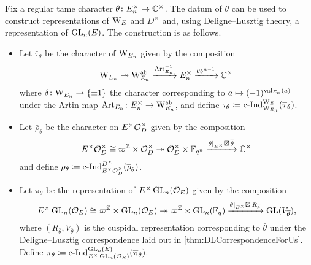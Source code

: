 \documentclass[../main.tex]{subfiles}
\begin{document}
Fix a regular tame character $\theta\colon  E_n^\times \to \mathbb{C}^\times$. 
The datum of $\theta$ can be used to construct representations
of $\mathrm W_E$ and $D^\times$ and, using Deligne--Lusztig
theory, a representation of $\operatorname{GL}_n(E)$. The construction is as follows.
\begin{itemize}
  \item Let $\bar \tau_\theta$ be the character of $\mathrm W_{E_n}$ given by 
    the composition
    \begin{equation*}
      \mathrm W_{E_n} \twoheadrightarrow \mathrm W_{E_n}^{\mathrm{ab}} \xrightarrow{\operatorname{Art}_{E_n}^{-1}} E_n^\times \xrightarrow{\theta \delta^{n-1}} \mathbb{C}^\times
    \end{equation*}
    where $\delta\colon \mathrm W_{E_n} \to \{\pm 1\}$ the character corresponding to
    $a \mapsto (-1)^{\mathrm{val}_{E_n}(a)}$ under the Artin map $\operatorname{Art}_{E_n}\colon
    E_n^\times \to \mathrm W_{E_n}^{\mathrm{ab}}$,
    and define $\tau_\theta \coloneqq \operatorname{c\text{-}Ind}_{\mathrm W_{E_n}}^{\mathrm W_E}(\overline \tau_\theta)$.

  \item Let $\bar \rho_\theta$ be the character on 
    $E^\times \mathcal{O}_D^\times$ given by the composition
    \begin{equation*}
      E^\times\mathcal{O}_D^\times \cong \varpi^{\mathbb{Z}} \times \mathcal{O}_D^\times \twoheadrightarrow 
      \mathcal{O}_D^\times \times \mathbb{F}_{q^n} \xrightarrow{\theta|_{E^\times} \boxtimes \,
      \overline \theta} \mathbb{C}^\times
    \end{equation*}
    and define $\rho_\theta \coloneqq \operatorname{c\text{-}Ind}_{E^\times
    \mathcal{O}_D^\times}^{D^\times}(\overline \rho_\theta)$.

  \item Let $\bar \pi_\theta$ be the representation of $E^\times \operatorname{GL}_n(\mathcal{O}_E)$
    given by the composition
    \begin{equation*}
      E^\times \operatorname{GL}_n(\mathcal{O}_E) \cong \varpi^{\mathbb{Z}} \times \operatorname{GL}_n(\mathcal{O}_E)
      \twoheadrightarrow \varpi^{\mathbb{Z}} \times \operatorname{GL}_n(\mathbb{F}_q) \xrightarrow{\theta|_{E^\times} \boxtimes \, 
      R_{\overline\theta}} \operatorname{GL}(V_{\overline \theta}),
    \end{equation*}
    where $(R_{\bar \theta}, V_{\bar \theta})$ is the cuspidal representation 
    corresponding to $\bar \theta$ under the Deligne--Lusztig correspondence laid out
    in \cref{thm:DLCorrespondenceForUs}.
    Define $\pi_\theta \coloneqq \operatorname{c\text{-}Ind}_{E^\times \operatorname{GL}_n(\mathcal{O}_E)}^{\operatorname{GL}_n(E)}(\overline
    \pi_\theta)$. 
\end{itemize}
\end{document}
